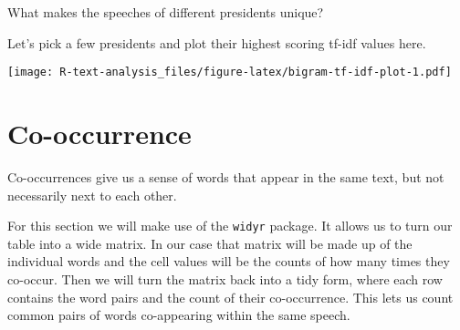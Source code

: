 \documentclass[]{book}
\newenvironment{Shaded}{\begin{snugshade}}{\end{snugshade}}
\newcommand{\DataTypeTok}[1]{\textcolor[rgb]{0.13,0.29,0.53}{#1}}
\newcommand{\DecValTok}[1]{\textcolor[rgb]{0.00,0.00,0.81}{#1}}
\newcommand{\KeywordTok}[1]{\textcolor[rgb]{0.13,0.29,0.53}{\textbf{#1}}}
\newcommand{\NormalTok}[1]{#1}
\newcommand{\OperatorTok}[1]{\textcolor[rgb]{0.81,0.36,0.00}{\textbf{#1}}}
\newcommand{\OtherTok}[1]{\textcolor[rgb]{0.56,0.35,0.01}{#1}}
\newcommand{\StringTok}[1]{\textcolor[rgb]{0.31,0.60,0.02}{#1}}
\begin{document}
What makes the speeches of different presidents unique?

Let's pick a few presidents and plot their highest scoring tf-idf values here.

\begin{Shaded}
\end{Shaded}

\texttt{[image: R-text-analysis\_files/figure-latex/bigram-tf-idf-plot-1.pdf]}

\hypertarget{co-occurrence}{%
\section{Co-occurrence}\label{co-occurrence}}

Co-occurrences give us a sense of words that appear in the same text, but not necessarily next to each other.

For this section we will make use of the \texttt{widyr} package. It allows us to turn our table into a wide matrix. In our case that matrix will be made up of the individual words and the cell values will be the counts of how many times they co-occur. Then we will turn the matrix back into a tidy form, where each row contains the word pairs and the count of their co-occurrence. This lets us count common pairs of words co-appearing within the same speech.
\end{document}
